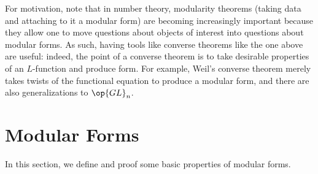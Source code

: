 \documentclass{amsart}
\begin{document}
For motivation, note that in number theory, modularity theorems (taking data and attaching to it a modular form) are becoming increasingly important because they allow one to move questions about objects of interest into questions about modular forms. As such, having tools like converse theorems like the one above are useful: indeed, the point of a converse theorem is to take desirable properties of an $L$-function and produce form. For example, Weil's converse theorem \cite[Theorem~1.5.1]{bump-forms} merely takes twists of the functional equation to produce a modular form, and there are also generalizations to $\op{GL}_n$.

\section{Modular Forms}
In this section, we define and proof some basic properties of modular forms.
\end{document}
